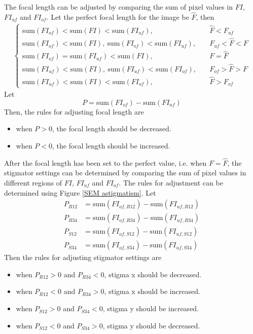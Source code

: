 \documentclass{article}
\begin{document}
The focal length can be adjusted by comparing the sum of pixel values in $FI$, $FI_{uf}$ and $FI_{of}$. Let the perfect focal length for the image be $\hat{F}$, then
\begin{align*}
\begin{cases}
    \text{sum}(FI_{of}) < \text{sum}(FI) < \text{sum}(FI_{uf}), \quad & \hat{F} < F_{uf} \\
    \text{sum}(FI_{of}) < \text{sum}(FI),\ \text{sum}(FI_{of}) < \text{sum}(FI_{uf}), \quad & F_{uf} < \hat{F} < F \\
    \text{sum}(FI_{of}) = \text{sum}(FI_{uf}) < \text{sum}(FI), \quad & F=\hat{F} \\
    \text{sum}(FI_{uf}) < \text{sum}(FI),\ \text{sum}(FI_{uf}) < \text{sum}(FI_{of}), \quad & F_{of} > \hat{F} > F \\
    \text{sum}(FI_{uf}) < \text{sum}(FI) < \text{sum}(FI_{of}), \quad & \hat{F} > F_{of}
\end{cases}
\end{align*}
Let
\begin{equation}
    P = \text{sum}(FI_{of}) - \text{sum}(FI_{uf})
\end{equation}
Then, the rules for adjusting focal length are
\begin{itemize}
    \item when $P>0$, the focal length should be decreased.
    \item when $P<0$, the focal length should be increased.
\end{itemize}

After the focal length has been set to the perfect value, i.e. when $F=\hat{F}$, the stigmator settings can be determined by comparing the sum of pixel values in different regions of $FI$, $FI_{uf}$ and $FI_{of}$. The rules for adjustment can be determined using Figure \ref{SEM astigmatism}. Let
\begin{align}
    P_{R12} & = \text{sum}(FI_{of,R12}) - \text{sum}(FI_{uf,R12}) \\
    P_{R34} & = \text{sum}(FI_{of,R34}) - \text{sum}(FI_{uf,R34}) \\
    P_{S12} & = \text{sum}(FI_{of,S12}) - \text{sum}(FI_{uf,S12}) \\
    P_{S34} & = \text{sum}(FI_{of,S34}) - \text{sum}(FI_{uf,S34})
\end{align}
Then the rules for adjusting stigmator settings are
\begin{itemize}
    \item when $P_{R12}>0$ and $P_{R34}<0$, stigma x should be decreased.
    \item when $P_{R12}<0$ and $P_{R34}>0$, stigma x should be increased.
    \item when $P_{S12}>0$ and $P_{S34}<0$, stigma y should be increased.
    \item when $P_{S12}<0$ and $P_{S34}>0$, stigma y should be decreased.
\end{itemize}
\end{document}
